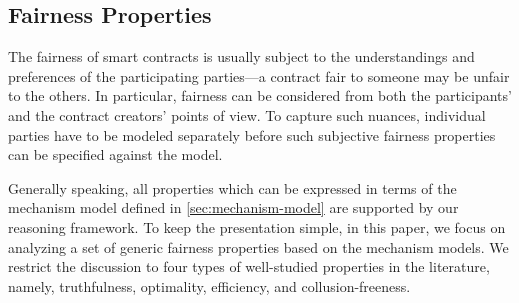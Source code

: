 

\subsection{Fairness Properties}\label{subsec:FairnessProperty}
The fairness of smart contracts is usually subject to the understandings and preferences of the
participating parties---a contract fair to someone may be unfair to the others.
In particular, fairness can be considered from both the participants' and the contract creators'
points of view.
To capture such nuances, individual parties have to be modeled separately before such subjective
fairness properties can be specified against the model.

Generally speaking, all properties which can be expressed in terms of the mechanism model defined
in \cref{sec:mechanism-model} are supported by our reasoning framework.
To keep the presentation simple, in this paper, we focus on analyzing a set of generic fairness
properties based on the mechanism models.
We restrict the discussion to four types of well-studied properties in the literature, namely,
truthfulness, optimality, efficiency, and collusion-freeness.

